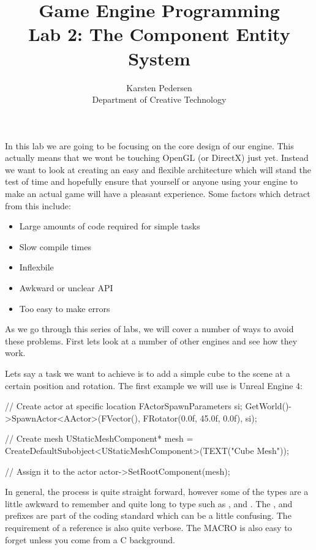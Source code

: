 \documentclass[10pt]{article}
\begin{document}
\title{Game Engine Programming \\
  \large Lab 2: The Component Entity System}

\author{Karsten Pedersen\\ Department of Creative Technology}
\maketitle

In this lab we are going to be focusing on the core design of our
engine. This actually means that we wont be touching OpenGL (or DirectX)
just yet.  Instead we want to look at creating an easy and flexible
architecture which will stand the test of time and hopefully ensure that
yourself or anyone using your engine to make an actual game will have
a pleasant experience. Some factors which detract from this include:

\begin{itemize}
\item Large amounts of code required for simple tasks
\item Slow compile times
\item Inflexbile
\item Awkward or unclear API
\item Too easy to make errors
\end{itemize}

As we go through this series of labs, we will cover a number of ways to
avoid these problems. First lets look at a number of other engines and see how they work.

Lets say a task we want to achieve is to add a simple cube to the scene at a certain position and rotation. The first example we will use is Unreal Engine 4:

\begin{Code}

// Create actor at specific location
FActorSpawnParameters si;
GetWorld()->SpawnActor<AActor>(FVector(), FRotator(0.0f, 45.0f, 0.0f), si);

// Create mesh
UStaticMeshComponent* mesh =
  CreateDefaultSubobject<UStaticMeshComponent>(TEXT("Cube Mesh"));

// Assign it to the actor
actor->SetRootComponent(mesh);

\end{Code}

In general, the process is quite straight forward, however some of
the types are a little awkward to remember and quite long to type
such as ,  and
. The ,  and 
prefixes are part of the coding standard which can be a little
confusing. The requirement of a  reference is
also quite verbose. The  MACRO is also easy to forget unless
you come from a C background.
\end{document}
